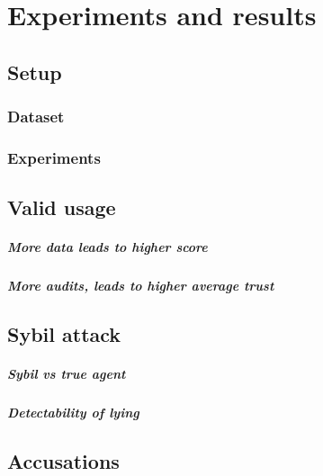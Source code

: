 \chapter{Experiments and results}

\section{Setup}
\subsection{Dataset}
\subsection{Experiments}
\section{Valid usage}
\paragraph{More data leads to higher score}
\paragraph{More audits, leads to higher average trust}
\section{Sybil attack}
\paragraph{Sybil vs true agent}
\paragraph{Detectability of lying}
\section{Accusations}
